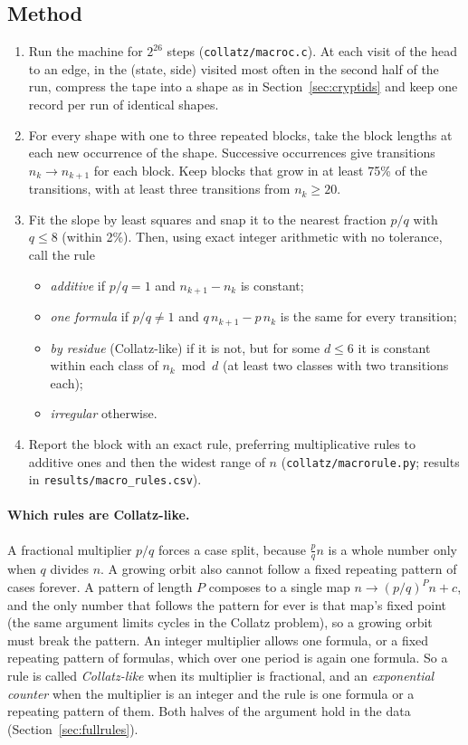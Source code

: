 \documentclass[11pt,a4paper]{article}
\begin{document}
\subsection{Method}
\begin{enumerate}
\item Run the machine for $2^{26}$ steps (\texttt{collatz/macroc.c}). At each visit of the head to
an edge, in the (state, side) visited most often in the second half of the run, compress the tape
into a shape as in Section~\ref{sec:cryptids} and keep one record per run of identical shapes.
\item For every shape with one to three repeated blocks, take the block lengths at each new
occurrence of the shape. Successive occurrences give transitions $n_k \to n_{k+1}$ for each block.
Keep blocks that grow in at least 75\% of the transitions, with at least three transitions from
$n_k \ge 20$.
\item Fit the slope by least squares and snap it to the nearest fraction $p/q$ with $q \le 8$
(within 2\%). Then, using exact integer arithmetic with no tolerance, call the rule
\begin{itemize}
\item \emph{additive} if $p/q = 1$ and $n_{k+1} - n_k$ is constant;
\item \emph{one formula} if $p/q \ne 1$ and $q\,n_{k+1} - p\,n_k$ is the same for every transition;
\item \emph{by residue} (Collatz-like) if it is not, but for some $d \le 6$ it is constant within
each class of $n_k \bmod d$ (at least two classes with two transitions each);
\item \emph{irregular} otherwise.
\end{itemize}
\item Report the block with an exact rule, preferring multiplicative rules to additive ones and then
the widest range of $n$ (\texttt{collatz/macrorule.py}; results in \texttt{results/macro\_rules.csv}).
\end{enumerate}
\paragraph{Which rules are Collatz-like.} A fractional multiplier $p/q$ forces a case split, because
$\tfrac pq n$ is a whole number only when $q$ divides $n$. A growing orbit also cannot follow a
fixed repeating pattern of cases forever. A pattern of length $P$ composes to a single map
$n \to (p/q)^P n + c$, and the only number that follows the pattern for ever is that map's fixed
point (the same argument limits cycles in the Collatz problem), so a growing orbit must break the
pattern. An integer multiplier allows one formula, or a fixed repeating pattern of formulas, which
over one period is again one formula. So a rule is called \emph{Collatz-like} when its multiplier
is fractional, and an \emph{exponential counter} when the multiplier is an integer and the rule
is one formula or a repeating pattern of them. Both halves of the argument hold in the data
(Section~\ref{sec:fullrules}).
\end{document}
